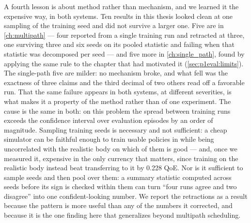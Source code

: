 A fourth lesson is about method rather than mechanism, and we learned it the expensive way, in both
systems. Ten results in this thesis looked clean at one sampling of the training seed and did not survive
a larger one. Five are in \cref{ch:multipath} --- four reported from a single training run and retracted
at three, one surviving three and six seeds on its pooled statistic and failing when that statistic was
decomposed per seed --- and five more in \cref{ch:single_path}, found by applying the same rule to the
chapter that had motivated it (\cref{sec:p1eval:limits}). The single-path five are milder: no mechanism
broke, and what fell was the exactness of three claims and the third decimal of two others read off a
favorable run. That the same failure appears in both systems, at different severities, is what makes it a
property of the method rather than of one experiment. The cause is the same in both:
on this problem the spread between training runs exceeds the confidence interval over evaluation
episodes by an order of magnitude. Sampling training seeds is necessary and not sufficient: a cheap
simulator can be faithful enough to train usable policies in while being uncorrelated with the realistic
body on which of them is good --- and, once we measured it, expensive in the only currency that matters,
since training on the realistic body instead beat transferring to it by 0.228 QoE. Nor is it sufficient
to sample seeds and then pool over them: a summary
statistic computed across seeds before its sign is checked within them can turn ``four runs agree and
two disagree'' into one confident-looking number. We report the retractions as a result because the
pattern is more useful than any of the numbers it corrected, and because it is the one finding here that
generalizes beyond multipath scheduling.

